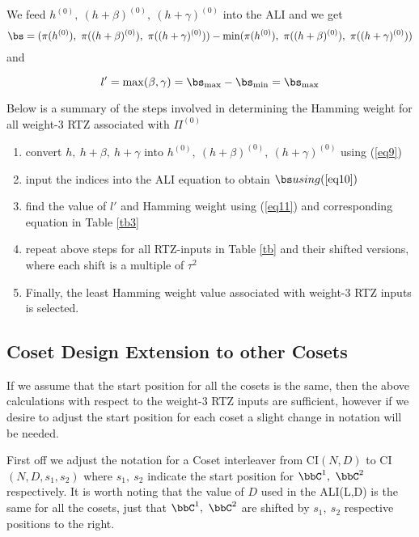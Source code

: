  We feed $h^{(0)},~(h+\beta)^{(0)},~(h+\gamma)^{(0)}$ into the ALI and we get \begin{equation}
 \bs=(\pi(h^{(0)}),~\pi((h+\beta)^{(0)}),~\pi((h+\gamma)^{(0)}))-\min(\pi(h^{(0)}),~\pi((h+\beta)^{(0)}),~\pi((h+\gamma)^{(0)}))
 \label{eq10}
 \end{equation}
  and 
 
 \begin{equation}
 l'=\max(\beta,\gamma)= \bs_{\max}-\bs_{\min}=\bs_{\max}
 \label{eq11}
 \end{equation}
 
 Below is a summary of the steps involved in determining the Hamming weight for all weight-$3$ RTZ associated with $\Pi^{(0)}$ 
 \begin{enumerate}
 \item convert  $h,~h+\beta,~h+\gamma$ into $h^{(0)},~(h+\beta)^{(0)},~(h+\gamma)^{(0)}$ using (\ref{eq9})
 
 \item input the indices into the ALI equation to obtain $\bs using (\ref{eq10})$
 
 \item find the value of $l'$ and  Hamming weight using (\ref{eq11}) and corresponding equation in Table \ref{tb3}
 
 \item repeat above steps for all RTZ-inputs in Table \ref{tb} and their shifted versions, where each shift is a multiple of $\tau^2$
 
\item Finally, the least Hamming weight value associated with weight-$3$ RTZ inputs is selected.
 \end{enumerate}
 
 \subsection{Coset Design Extension to other Cosets}
 If we assume that the start position for all the cosets is the same, then the above calculations with respect to the weight-$3$ RTZ inputs are sufficient, however if we desire to adjust the start position for each coset a slight change in notation will be needed. 
 
 First off we adjust the notation for a Coset interleaver from CI$(N,D)$ to CI$(N,D,s_1,s_2)$ where $s_1,~s_2$ indicate the start position for $\bbC^1,~\bbC^2$ respectively. It is worth noting that the value of $D$ used in the ALI(L,D) is the same for all the cosets, just that $\bbC^1,~\bbC^2$ are shifted by  $s_1,~s_2$ respective positions to the right.
 
